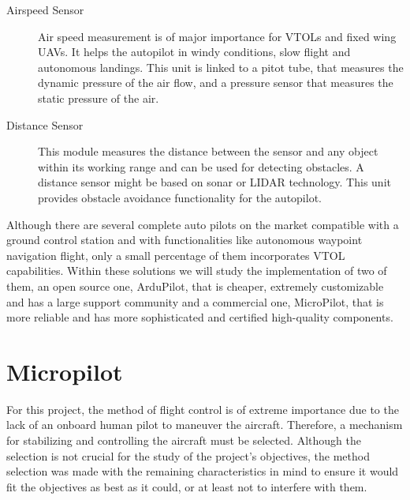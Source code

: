 \documentclass[english,fira]{ist-report}
\begin{document}
\begin{description}
	\item[Airspeed Sensor] Air speed measurement is of major importance for VTOLs and fixed wing UAVs. It helps the autopilot in windy conditions, slow flight and autonomous landings. This unit is linked to a pitot tube, that measures the dynamic pressure of the air flow, and a pressure sensor that measures the static pressure of the air. 
	\item[Distance Sensor] This module measures the distance between the sensor and any object within its working range and can be used for detecting obstacles. A distance sensor might be based on sonar or LIDAR technology. This unit provides obstacle avoidance functionality for the autopilot.
\end{description}
Although there are several complete auto pilots on the market compatible with a ground control station and with functionalities like autonomous waypoint navigation flight, only a small percentage of them incorporates VTOL capabilities. Within these solutions we will study the implementation of two of them, an open source one, ArduPilot, that is cheaper, extremely customizable and has a large support community and a commercial one, MicroPilot, that is more reliable and has more sophisticated and certified high-quality components.


\section{Micropilot}

For this project, the method of flight control is of extreme importance due to the lack of an onboard human pilot to maneuver the aircraft. Therefore, a mechanism for stabilizing and controlling the aircraft must be selected. Although the selection is not crucial for the study of the project's objectives, the method selection was made with the remaining characteristics in mind to ensure it would fit the objectives as best as it could, or at least not to interfere with them.
\end{document}
